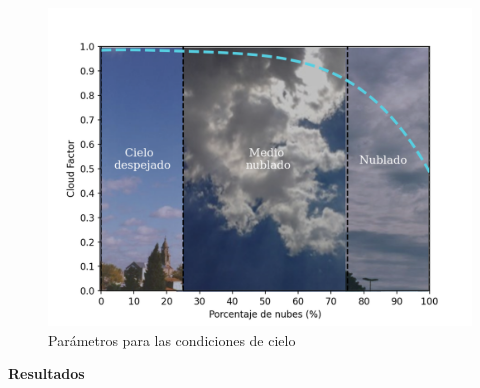 \documentclass{article}
\begin{document}
\begin{multicols}{2}
\begin{figure}[H]
    \centering
    \includegraphics[scale=0.5]{images/nubes.png}
    \caption{Parámetros para las condiciones de cielo}
\end{figure}
\begin{center}
\begin{shaded}
\textbf{\textcolor{na}{Resultados}}
\end{shaded}
\end{center}
\vspace{-0.2cm}
\begin{figure}[H]
    \begin{subfigure}[H]{0.5\linewidth}
        \changefontsizes{9pt}
        \caption{}
        \centering
        \vspace{-0.1cm}

\end{subfigure}
\end{figure}
\end{multicols}
\end{document}

